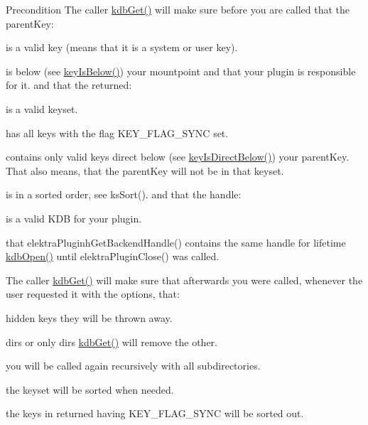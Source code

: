 \begin{DoxyPrecond}{Precondition}
The caller \hyperlink{group__kdb_ga28e385fd9cb7ccfe0b2f1ed2f62453a1}{kdb\-Get()} will make sure before you are called that the parent\-Key\-:
\begin{DoxyItemize}
\item is a valid key (means that it is a system or user key).
\item is below (see \hyperlink{group__keytest_ga03332b5d97c76a4fd2640aca4762b8df}{key\-Is\-Below()}) your mountpoint and that your plugin is responsible for it. and that the returned\-:
\item is a valid keyset.
\item has {\ttfamily all} keys with the flag K\-E\-Y\-\_\-\-F\-L\-A\-G\-\_\-\-S\-Y\-N\-C set.
\item contains only valid keys direct below (see \hyperlink{group__keytest_ga4f175aafd98948ce6c774f3bd92b72ca}{key\-Is\-Direct\-Below()}) your parent\-Key. That also means, that the parent\-Key will not be in that keyset.
\item is in a sorted order, see ks\-Sort(). and that the handle\-:
\begin{DoxyItemize}
\item is a valid K\-D\-B for your plugin.
\item that elektra\-Pluginh\-Get\-Backend\-Handle() contains the same handle for lifetime \hyperlink{group__kdb_ga6808defe5870f328dd17910aacbdc6ca}{kdb\-Open()} until elektra\-Plugin\-Close() was called.
\end{DoxyItemize}
\end{DoxyItemize}

The caller \hyperlink{group__kdb_ga28e385fd9cb7ccfe0b2f1ed2f62453a1}{kdb\-Get()} will make sure that afterwards you were called, whenever the user requested it with the options, that\-:
\begin{DoxyItemize}
\item hidden keys they will be thrown away.
\item dirs or only dirs \hyperlink{group__kdb_ga28e385fd9cb7ccfe0b2f1ed2f62453a1}{kdb\-Get()} will remove the other.
\item you will be called again recursively with all subdirectories.
\item the keyset will be sorted when needed.
\item the keys in returned having K\-E\-Y\-\_\-\-F\-L\-A\-G\-\_\-\-S\-Y\-N\-C will be sorted out.
\end{DoxyItemize}
\end{DoxyPrecond}
